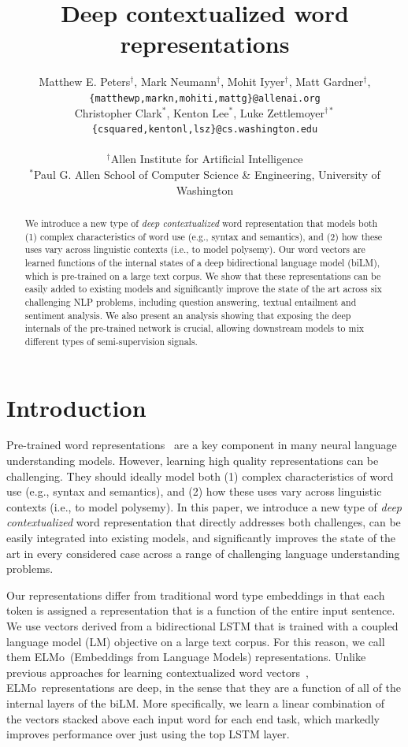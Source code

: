 \documentclass[11pt,a4paper]{article}
\title{Deep contextualized word representations}
\author{Matthew E. Peters$^\dagger$, Mark Neumann$^\dagger$, Mohit Iyyer$^\dagger$, Matt Gardner$^\dagger$, \\
\texttt{\{matthewp,markn,mohiti,mattg\}@allenai.org} \\
\AND
Christopher Clark$^*$, Kenton Lee$^*$, Luke Zettlemoyer$^{\dagger*}$ \\
\texttt{\{csquared,kentonl,lsz\}@cs.washington.edu} \\
\\ $^\dagger$Allen Institute for Artificial Intelligence \\
$^*$Paul G. Allen School of Computer Science \& Engineering, University of Washington
}
\newcommand{\ELMO}{ELMo}
\begin{document}
\maketitle

\begin{abstract}
We introduce a new type of {\em deep contextualized} word representation that models both (1) complex characteristics of word use (e.g., syntax and semantics), and (2) how these uses vary across linguistic
contexts (i.e., to model polysemy).
Our word vectors are learned functions of the internal states of a deep bidirectional language model (biLM), which is pre-trained on a large text corpus.
We show that these representations can be easily added to existing models and significantly improve the state of the art across six challenging NLP problems, including question answering, textual entailment and sentiment analysis.
We also present an analysis showing that exposing the deep internals of the pre-trained network is crucial, allowing downstream models to mix different types of semi-supervision signals.

\end{abstract}

\section{Introduction}
Pre-trained word representations~\citep{word2vec,Pennington2014GloveGV} are a key component in many neural language understanding models. 
However, learning high quality representations can be challenging.
They should ideally model both (1) complex characteristics of word use (e.g., syntax and semantics), and (2) how these uses vary across linguistic
contexts (i.e., to model polysemy).
In this paper, we introduce a new type of {\em deep contextualized} word representation that directly addresses both challenges, can be easily integrated into existing models, and significantly improves the state of the art in every considered case across a range of challenging language understanding problems.

Our representations differ from traditional word type embeddings in that each token is assigned a representation that is a function of the entire input sentence. We use vectors derived from a bidirectional LSTM that is trained with a coupled language model (LM) objective on a large text corpus. For this reason, we call them \ELMO\ (Embeddings from Language Models) representations. Unlike previous approaches for learning contextualized word vectors~\citep{Peters2017SemisupervisedST,McCann2017LearnedIT}, \ELMO\ representations are deep, in the sense that they are a function of all of the internal layers of the biLM. More specifically, we learn a linear combination of the vectors stacked above each input word for each end task, which markedly improves performance over just using the top LSTM layer.
\end{document}
